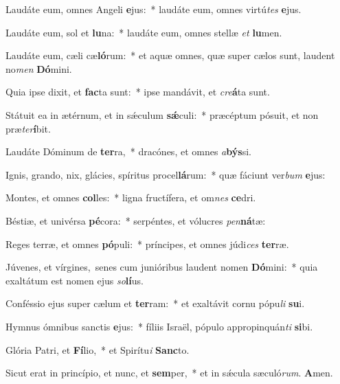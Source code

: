 Laudáte eum, omnes Angeli \textbf{e}jus:~* laudáte eum, omnes virtú\textit{tes} \textbf{e}jus.

Laudáte eum, sol et \textbf{lu}na:~* laudáte eum, omnes stellæ \textit{et} \textbf{lu}men.

Laudáte eum, cæli cæ\textbf{ló}rum:~* et aquæ omnes, quæ super cælos sunt, laudent no\textit{men} \textbf{Dó}mini.

Quia ipse dixit, et \textbf{fac}ta sunt:~* ipse mandávit, et \textit{cre}\textbf{á}ta sunt.

Státuit ea in ætérnum, et in sǽculum \textbf{sǽ}culi:~* præcéptum pósuit, et non præ\textit{ter}\textbf{í}bit.

Laudáte Dóminum de \textbf{ter}ra,~* dracónes, et omnes \textit{a}\textbf{býs}si.

Ignis, grando, nix, glácies, spíritus procel\textbf{lá}rum:~* quæ fáciunt ver\textit{bum} \textbf{e}jus:

Montes, et omnes \textbf{col}les:~* ligna fructífera, et om\textit{nes} \textbf{ce}dri.

Béstiæ, et univérsa \textbf{pé}cora:~* serpéntes, et vólucres \textit{pen}\textbf{ná}tæ:

Reges terræ, et omnes \textbf{pó}puli:~* príncipes, et omnes júdi\textit{ces} \textbf{ter}ræ.

Júvenes, et vírgines,~\reddagger senes cum junióribus laudent nomen \textbf{Dó}mini:~* quia exaltátum est nomen ejus \textit{so}\textbf{lí}us.

Conféssio ejus super cælum et \textbf{ter}ram:~* et exaltávit cornu pópu\textit{li} \textbf{su}i.

Hymnus ómnibus sanctis \textbf{e}jus:~* fíliis Israël, pópulo appropinquán\textit{ti} \textbf{si}bi.

Glória Patri, et \textbf{Fí}lio,~* et Spirítu\textit{i} \textbf{Sanc}to.

Sicut erat in princípio, et nunc, et \textbf{sem}per,~* et in sǽcula sæculó\textit{rum}. \textbf{A}men.

